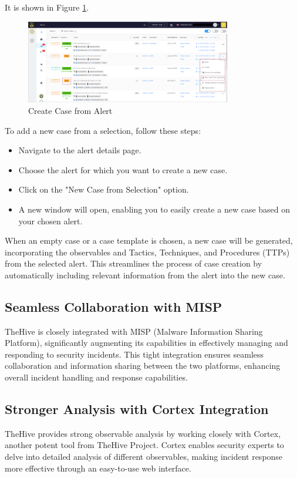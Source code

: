\documentclass{article}
\begin{document}
It is shown in Figure \ref{fig:case}.
\begin{figure}[H]
    \centering
    \includegraphics[width=0.8\textwidth]{img26.png}
    \caption{Create Case from Alert}
    \label{fig:case}
\end{figure}

To add a new case from a selection, follow these steps:

\begin{itemize}
  \item Navigate to the alert details page.
  \item Choose the alert for which you want to create a new case.
  \item Click on the "New Case from Selection" option.
  \item A new window will open, enabling you to easily create a new case based on your chosen alert.
\end{itemize}


When an empty case or a case template is chosen, a new case will be generated, incorporating the observables and Tactics, Techniques, and Procedures (TTPs) from the selected alert. This streamlines the process of case creation by automatically including relevant information from the alert into the new case.\\



\subsection{Seamless Collaboration with MISP}
TheHive is closely integrated with MISP (Malware Information Sharing Platform), significantly augmenting its capabilities in effectively managing and responding to security incidents. This tight integration ensures seamless collaboration and information sharing between the two platforms, enhancing overall incident handling and response capabilities.

\subsection{Stronger Analysis with Cortex Integration}
TheHive provides strong observable analysis by working closely with Cortex, another potent tool from TheHive Project. Cortex enables security experts to delve into detailed analysis of different observables, making incident response more effective through an easy-to-use web interface.\\
\end{document}
